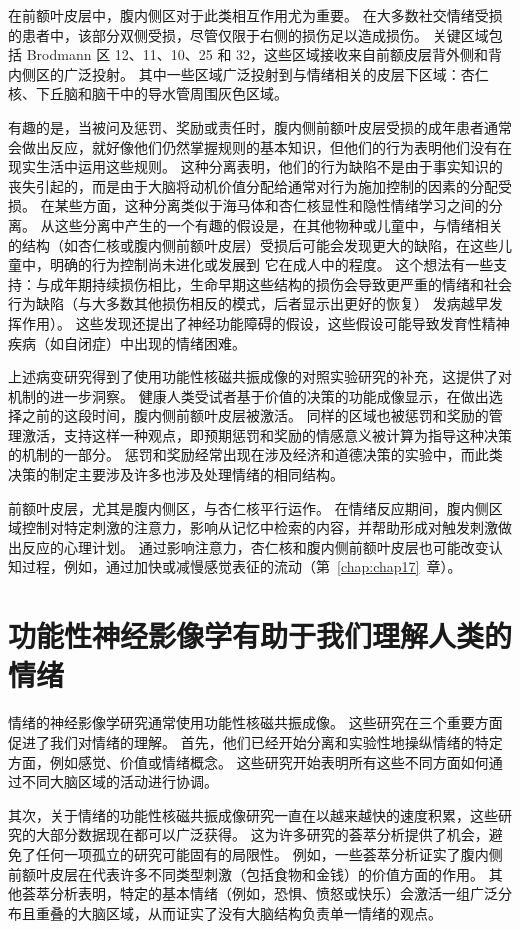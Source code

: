 在前额叶皮层中，腹内侧区对于此类相互作用尤为重要。 在大多数社交情绪受损的患者中，该部分双侧受损，尽管仅限于右侧的损伤足以造成损伤。
关键区域包括 Brodmann 区 12、11、10、25 和 32，这些区域接收来自前额皮层背外侧和背内侧区的广泛投射。
其中一些区域广泛投射到与情绪相关的皮层下区域：杏仁核、下丘脑和脑干中的导水管周围灰色区域。


有趣的是，当被问及惩罚、奖励或责任时，腹内侧前额叶皮层受损的成年患者通常会做出反应，就好像他们仍然掌握规则的基本知识，但他们的行为表明他们没有在现实生活中运用这些规则。
这种分离表明，他们的行为缺陷不是由于事实知识的丧失引起的，而是由于大脑将动机价值分配给通常对行为施加控制的因素的分配受损。
在某些方面，这种分离类似于海马体和杏仁核显性和隐性情绪学习之间的分离。
从这些分离中产生的一个有趣的假设是，在其他物种或儿童中，与情绪相关的结构（如杏仁核或腹内侧前额叶皮层）受损后可能会发现更大的缺陷，在这些儿童中，明确的行为控制尚未进化或发展到 它在成人中的程度。
这个想法有一些支持：与成年期持续损伤相比，生命早期这些结构的损伤会导致更严重的情绪和社会行为缺陷（与大多数其他损伤相反的模式，后者显示出更好的恢复） 发病越早发挥作用）。
这些发现还提出了神经功能障碍的假设，这些假设可能导致发育性精神疾病（如自闭症）中出现的情绪困难。


上述病变研究得到了使用功能性核磁共振成像的对照实验研究的补充，这提供了对机制的进一步洞察。
健康人类受试者基于价值的决策的功能成像显示，在做出选择之前的这段时间，腹内侧前额叶皮层被激活。
同样的区域也被惩罚和奖励的管理激活，支持这样一种观点，即预期惩罚和奖励的情感意义被计算为指导这种决策的机制的一部分。
惩罚和奖励经常出现在涉及经济和道德决策的实验中，而此类决策的制定主要涉及许多也涉及处理情绪的相同结构。


前额叶皮层，尤其是腹内侧区，与杏仁核平行运作。
在情绪反应期间，腹内侧区域控制对特定刺激的注意力，影响从记忆中检索的内容，并帮助形成对触发刺激做出反应的心理计划。
通过影响注意力，杏仁核和腹内侧前额叶皮层也可能改变认知过程，例如，通过加快或减慢感觉表征的流动（第~\ref{chap:chap17}~章）。



\section{功能性神经影像学有助于我们理解人类的情绪}

情绪的神经影像学研究通常使用功能性核磁共振成像。 这些研究在三个重要方面促进了我们对情绪的理解。
首先，他们已经开始分离和实验性地操纵情绪的特定方面，例如感觉、价值或情绪概念。
这些研究开始表明所有这些不同方面如何通过不同大脑区域的活动进行协调。


其次，关于情绪的功能性核磁共振成像研究一直在以越来越快的速度积累，这些研究的大部分数据现在都可以广泛获得。
这为许多研究的荟萃分析提供了机会，避免了任何一项孤立的研究可能固有的局限性。
例如，一些荟萃分析证实了腹内侧前额叶皮层在代表许多不同类型刺激（包括食物和金钱）的价值方面的作用。
其他荟萃分析表明，特定的基本情绪（例如，恐惧、愤怒或快乐）会激活一组广泛分布且重叠的大脑区域，从而证实了没有大脑结构负责单一情绪的观点。


